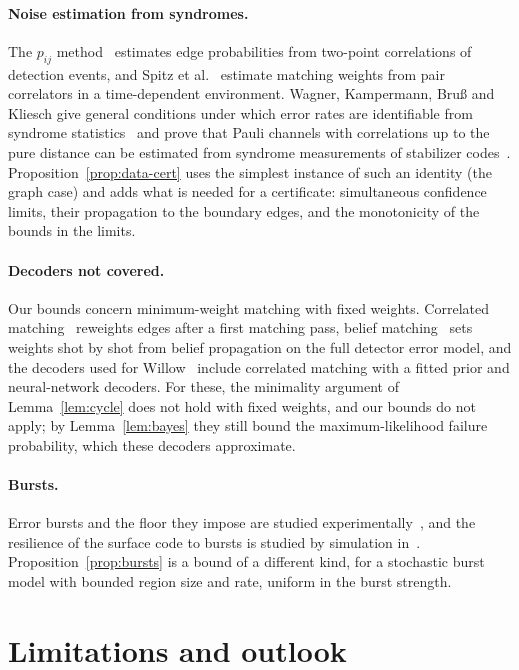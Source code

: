 \documentclass[11pt]{article}
\theoremstyle{plain}
\theoremstyle{definition}
\theoremstyle{remark}
\renewcommand{\_}{\oldunderscore\allowbreak}
\begin{document}
\paragraph{Noise estimation from syndromes.} The $p_{ij}$ method~\cite{Google21} estimates edge probabilities from two-point correlations of detection events, and Spitz et al.~\cite{Spitz} estimate matching weights from pair correlators in a time-dependent environment. Wagner, Kampermann, Bru{\ss} and Kliesch give general conditions under which error rates are identifiable from syndrome statistics~\cite{WKBK21} and prove that Pauli channels with correlations up to the pure distance can be estimated from syndrome measurements of stabilizer codes~\cite{WKBK22}. Proposition~\ref{prop:data-cert} uses the simplest instance of such an identity (the graph case) and adds what is needed for a certificate: simultaneous confidence limits, their propagation to the boundary edges, and the monotonicity of the bounds in the limits.

\paragraph{Decoders not covered.} Our bounds concern minimum-weight matching with fixed weights. Correlated matching~\cite{FowlerCorr} reweights edges after a first matching pass, belief matching~\cite{BeliefMatching} sets weights shot by shot from belief propagation on the full detector error model, and the decoders used for Willow~\cite{Google24} include correlated matching with a fitted prior and neural-network decoders. For these, the minimality argument of Lemma~\ref{lem:cycle} does not hold with fixed weights, and our bounds do not apply; by Lemma~\ref{lem:bayes} they still bound the maximum-likelihood failure probability, which these decoders approximate.

\paragraph{Bursts.} Error bursts and the floor they impose are studied experimentally~\cite{McEwen,Google22,Google24}, and the resilience of the surface code to bursts is studied by simulation in~\cite{TPMP}. Proposition~\ref{prop:bursts} is a bound of a different kind, for a stochastic burst model with bounded region size and rate, uniform in the burst strength.

\section{Limitations and outlook}\label{sec:limits}
\end{document}
